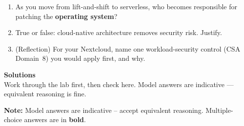 \documentclass[11pt]{article}
\begin{document}
\begin{enumerate}
      calls?
\item As you move from lift-and-shift to serverless, who becomes responsible for patching the
      \textbf{operating system}?
\item True or false: cloud-native architecture removes security risk. Justify.
\item (Reflection) For your Nextcloud, name one workload-security control (CSA Domain~8) you would
      apply first, and why.
\end{enumerate}

\signoff

\clearpage
\solheader
{\LARGE\bfseries\color{kred} Solutions}\\[2pt]
{\small Work through the lab first, then check here. Model answers are indicative — equivalent reasoning is fine.}\par\vspace{8pt}
\noindent\textbf{Note:} Model answers are indicative -- accept equivalent reasoning. Multiple-choice
answers are in \textbf{bold}.
\end{document}
